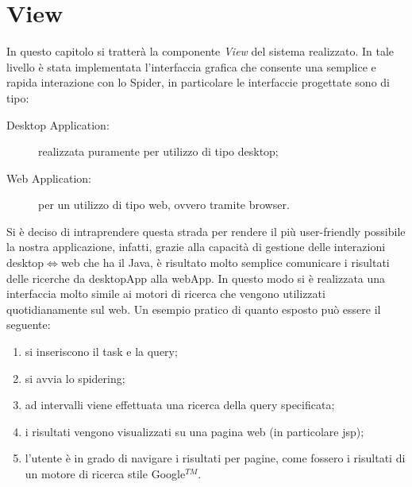 \chapter{View}\label{cap:view}
In questo capitolo si tratterà la componente \textit{View} del sistema realizzato. In tale livello è stata implementata l'interfaccia grafica che consente una semplice e rapida interazione con lo Spider, in particolare le interfaccie progettate sono di tipo:
\begin{description}
\item[Desktop Application:] realizzata puramente per utilizzo di tipo desktop;
\item[Web Application:] per un utilizzo di tipo web, ovvero tramite browser.
\end{description}
Si è deciso di intraprendere questa strada per rendere il più user-friendly possibile la nostra applicazione, infatti, grazie alla capacità di gestione delle interazioni desktop$\Leftrightarrow$web che ha il Java, è risultato molto semplice comunicare i risultati delle ricerche da desktopApp alla webApp. In questo modo si è realizzata una interfaccia molto simile ai motori di ricerca che vengono utilizzati quotidianamente sul web. Un esempio pratico di quanto esposto può essere il seguente:
\begin{enumerate}
\item si inseriscono il task e la query;
\item si avvia lo spidering;
\item ad intervalli viene effettuata una ricerca della query specificata;
\item i risultati vengono visualizzati su una pagina web (in particolare jsp);
\item l'utente è in grado di navigare i risultati per pagine, come fossero i risultati di un motore di ricerca stile Google$^{TM}$.
\end{enumerate}

